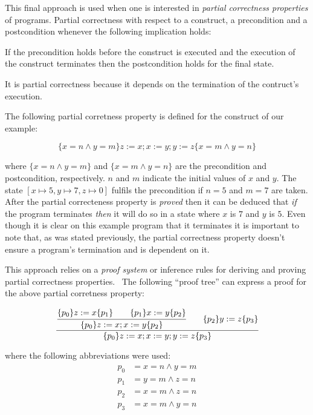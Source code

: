 This final approach is used when one is interested in \textit{partial correctness properties} of programs.
Partial correctness with respect to a construct, a precondition and a postcondition whenever the following implication holds:

\begin{displayquote}
If the precondition holds before the construct is executed and the execution of the construct terminates then the postcondition holds for the final state.
\end{displayquote}

It is partial correctness because it depends on the termination of the contruct's execution.~\parencite{nipkow}


The following partial corretness property is defined for the construct of our example:

\begin{equation*}
\lbrace x=n \land y=m \rbrace z:=x; x:=y; y:=z \lbrace x=m \land y=n \rbrace
\end{equation*}

where $\lbrace x=n \land y=m \rbrace $ and $\lbrace x=m \land y=n \rbrace $ are the precondition and postcondition, respectively.
$n$ and $m$ indicate the initial values of $x$ and $y$.
The state $[x\mapsto5, y\mapsto7, z\mapsto0]$ fulfils the precondition if $n=5$ and $m=7$ are taken.
After the partial correcteness property is \textit{proved} then it can be deduced that \textit{if} the program terminates \textit{then} it will do so in a state where $x$ is $7$ and $y$ is $5$.
Even though it is clear on this example program that it terminates it is important to note that, as was stated previously, the partial correctness property doesn't ensure a program's termination and is dependent on it.

This approach relies on a \textit{proof system} or inference rules for deriving and proving partial correctness properties.~\parencite{nipkow}
The following ``proof tree'' can express a proof for the above partial corretness property:

\begin{equation*}
\cfrac{
  \cfrac{ \lbrace p_{0} \rbrace z:=x \lbrace p_{1} \rbrace \qquad \lbrace p_{1} \rbrace x:=y \lbrace p_{2} \rbrace }
    { \lbrace p_{0} \rbrace z:=x; x:=y \lbrace p_{2} \rbrace }
  \qquad
 \lbrace p_{2} \rbrace y:=z \lbrace p_{3} \rbrace
  }
  { \lbrace p_{0} \rbrace z:=x; x:=y; y:=z \lbrace p_{3} \rbrace }
\end{equation*}

where the following abbreviations were used:
\begin{align*}
p_{0} &= x=n \land y=m\\
p_{1} &= y=m \land z=n\\
p_{2} &= x=m \land z=n\\
p_{3} &= x=m \land y=n
\end{align*}

